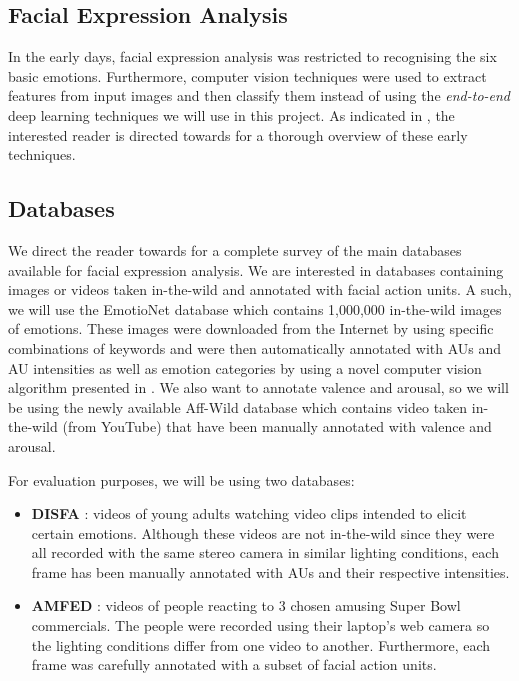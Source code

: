 \documentclass[12pt,twoside]{article}
\begin{document}
\subsection{Facial Expression Analysis}

In the early days, facial expression analysis was restricted to recognising the six basic emotions. Furthermore, computer vision techniques were used to extract features from input images and then classify them instead of using the \textit{end-to-end} deep learning techniques we will use in this project. As indicated in \cite{RefWorks:2}, the interested reader is directed towards \cite{RefWorks:18,RefWorks:19} for a thorough overview of these early techniques.

\subsection{Databases}

We direct the reader towards \cite{RefWorks:2} for a complete survey of the main databases available for facial expression analysis. We are interested in databases containing images or videos taken in-the-wild and annotated with facial action units. A such, we will use the EmotioNet \cite{RefWorks:1} database which contains 1,000,000 in-the-wild images of emotions. These images were downloaded from the Internet by using specific combinations of keywords and were then automatically annotated with AUs and AU intensities as well as emotion categories by using a novel computer vision algorithm presented in \cite{RefWorks:1}. We also want to annotate valence and arousal, so we will be using the newly available Aff-Wild database \cite{RefWorks:2} which contains video taken in-the-wild (from YouTube) that have been manually annotated with valence and arousal.

For evaluation purposes, we will be using two databases:

\begin{itemize}
\item \textbf{DISFA} \cite{RefWorks:17}: videos of young adults watching video clips intended to elicit certain emotions. Although these videos are not in-the-wild since they were all recorded with the same stereo camera in similar lighting conditions, each frame has been manually annotated with AUs and their respective intensities.
\item \textbf{AMFED} \cite{RefWorks:18}: videos of people reacting to 3 chosen amusing Super Bowl commercials. The people were recorded using their laptop's web camera so the lighting conditions differ from one video to another. Furthermore, each frame was carefully annotated with a subset of facial action units.
\end{itemize}
\end{document}

